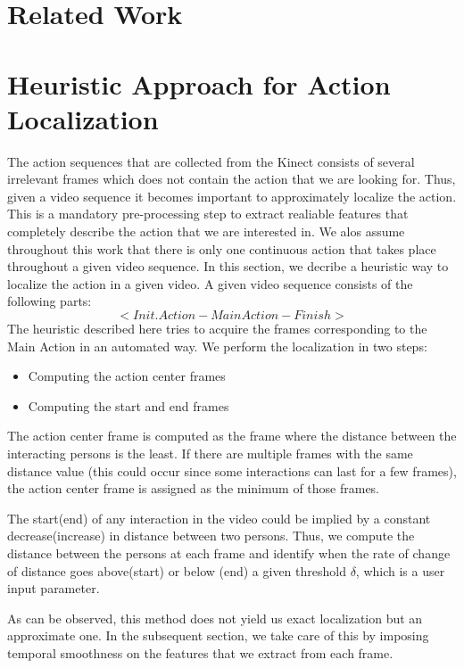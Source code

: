 \documentclass[10pt,twocolumn,letterpaper]{article}
\begin{document}
\section{Related Work}

\section{Heuristic Approach for Action Localization}\label{sec:actionlocalization}

The action sequences that are collected from the Kinect consists of several irrelevant frames which does not contain the action that we are looking for. Thus, given a video sequence it becomes important to approximately localize the action. This is a mandatory pre-processing step to extract realiable features that completely describe the action that  we are interested in. We alos assume throughout this work that there is only one continuous action that takes place throughout a given video sequence. In this section, we decribe a heuristic way to localize the action in a given video. A given video sequence consists of the following parts:
\begin{equation}
<Init. Action - Main Action - Finish>
\end{equation}
The heuristic described here tries to acquire the frames corresponding to the Main Action  in an automated way. We perform the localization in two steps:
\begin{itemize}
\item Computing the action center frames
\item Computing the start and end frames
\end{itemize}

The action center frame is computed as the frame where the distance between the interacting persons is the least. If there are multiple frames with the same distance value (this could occur since some interactions can last for a few frames), the action center frame is assigned as the minimum of those frames.

The start(end) of any interaction in the video could be implied by a constant decrease(increase) in distance between two persons. Thus, we compute the distance between the persons at each frame and identify when the rate of change of distance goes above(start) or below (end) a given threshold $\delta$, which is a user input parameter. 


As can be observed, this method does not yield us exact localization but an approximate one. In the subsequent section, we take care of this by imposing temporal smoothness on the features that we extract from each frame. 
\end{document}

